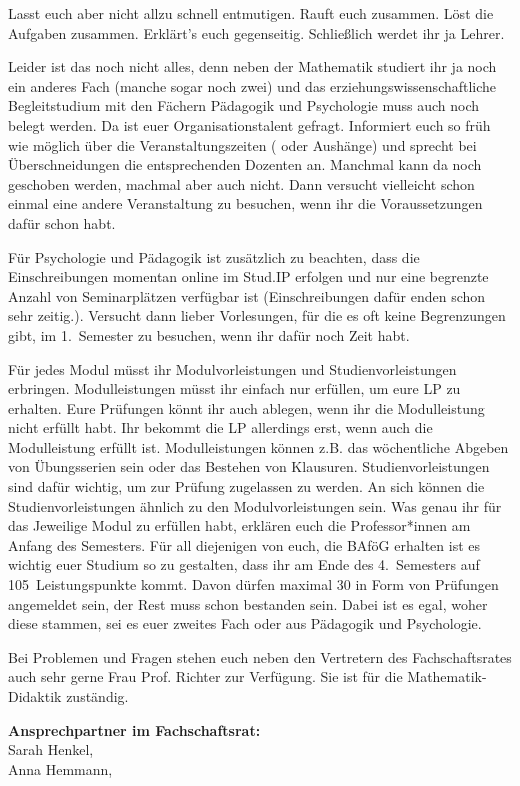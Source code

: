 Lasst euch aber nicht allzu schnell entmutigen.
Rauft euch zusammen.
Löst die Aufgaben zusammen.
Erklärt’s euch gegenseitig.
Schließlich werdet ihr ja Lehrer.

Leider ist das noch nicht alles, denn neben der Mathematik studiert ihr ja noch ein anderes Fach (manche sogar noch zwei) und das erziehungswissenschaftliche Begleitstudium mit den Fächern Pädagogik und Psychologie muss auch noch belegt werden.
Da ist euer Organisationstalent gefragt.
Informiert euch so früh wie möglich über die Veranstaltungszeiten ( oder Aushänge) und sprecht bei Überschneidungen die entsprechenden Dozenten an.
Manchmal kann da noch geschoben werden, machmal aber auch nicht.
Dann versucht vielleicht schon einmal eine andere Veranstaltung zu besuchen, wenn ihr die Voraussetzungen dafür schon habt.

Für Psychologie und Pädagogik ist zusätzlich zu beachten, dass die Einschreibungen momentan online im Stud.IP erfolgen und nur eine begrenzte Anzahl von Seminarplätzen verfügbar ist (Einschreibungen dafür enden schon sehr zeitig.).
Versucht dann lieber Vorlesungen, für die es oft keine Begrenzungen gibt, im 1.~Semester zu besuchen, wenn ihr dafür noch Zeit habt.

Für jedes Modul müsst ihr Modulvorleistungen und Studienvorleistungen erbringen. Modulleistungen müsst ihr einfach nur erfüllen, um eure LP zu erhalten. Eure Prüfungen könnt ihr auch ablegen, wenn ihr die Modulleistung nicht erfüllt habt. Ihr bekommt die LP allerdings erst, wenn auch die Modulleistung erfüllt ist. Modulleistungen können z.B. das wöchentliche Abgeben von Übungsserien sein oder das Bestehen von Klausuren.
Studienvorleistungen sind dafür wichtig, um zur Prüfung zugelassen zu werden. An sich können die Studienvorleistungen ähnlich zu den Modulvorleistungen sein. Was genau ihr für das Jeweilige Modul zu erfüllen habt, erklären euch die Professor*innen am Anfang des Semesters.
Für all diejenigen von euch, die BAföG erhalten ist es wichtig euer Studium so zu gestalten, dass ihr am Ende des 4.~Semesters auf 105~Leistungspunkte kommt.
Davon dürfen maximal 30 in Form von Prüfungen angemeldet sein, der Rest muss schon bestanden sein.
Dabei ist es egal, woher diese stammen, sei es euer zweites Fach oder aus Pädagogik und Psychologie.

Bei Problemen und Fragen stehen euch neben den Vertretern des Fachschaftsrates auch sehr gerne Frau Prof. Richter zur Verfügung.
Sie ist für die Mathematik-Didaktik zuständig.


\textbf{Ansprechpartner im Fachschaftsrat:}\\
Sarah Henkel, \\
Anna Hemmann, 




\label{studiengang_lehramt}

\label{studiengang_lag}

\label{studiengang_las}



